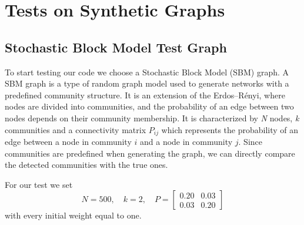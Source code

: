 \section{Tests on Synthetic Graphs}\label{sec5.2}
\subsection{Stochastic Block Model Test Graph}
To start testing our code we choose a Stochastic Block Model (SBM) graph. A SBM graph is a type of random graph model used to generate networks with a predefined community structure. It is an extension of the Erdos--R\'enyi, where nodes are divided into communities, and the probability of an edge between two nodes depends on their community membership. It is characterized by \textit{N} nodes, \textit{k} communities and a connectivity matrix \textit{$P_{ij}$} which represents the probability of an edge between a node in community $i$ and a node in community $j$.
Since communities are predefined when generating the graph, we can directly compare the detected communities with the true ones.

For our test we set 
\begin{equation*}
    N = 500, \quad k = 2, \quad
    P =
    \begin{bmatrix} 
        0.20 & 0.03 \\
        0.03 & 0.20
    \end{bmatrix}
\end{equation*}
with every initial weight equal to one.

